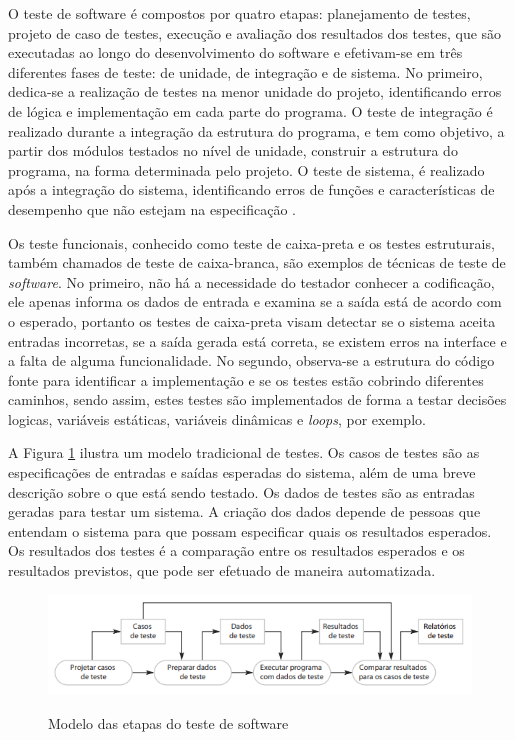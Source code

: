 O teste de software é compostos por quatro etapas: planejamento de testes, projeto de caso de testes, execução e avaliação dos resultados dos testes, que são executadas ao longo do desenvolvimento do software e efetivam-se em três diferentes fases de teste: de unidade, de integração e de sistema. No primeiro, dedica-se a realização de testes na menor unidade do projeto, identificando erros de lógica e implementação em cada parte do programa. O teste de integração é realizado durante a integração da estrutura do programa, e tem como objetivo, a partir dos módulos testados no nível de unidade, construir a estrutura do programa, na forma determinada pelo projeto. O teste de sistema, é realizado após a integração do sistema, identificando erros de funções e características de desempenho que não estejam na especificação \cite{Maldonado2004}.

Os teste funcionais, conhecido como teste de caixa-preta e os testes estruturais, também chamados de teste de caixa-branca, são exemplos de técnicas de teste de \textit{software}. No primeiro, não há a necessidade do testador conhecer a codificação, ele apenas informa os dados de entrada e examina se a saída está de acordo com o esperado, portanto os testes de caixa-preta visam detectar se o sistema aceita entradas incorretas, se a saída gerada está correta, se existem erros na interface e a falta de alguma funcionalidade. No segundo, observa-se a estrutura do código fonte para identificar a implementação e se os testes estão cobrindo diferentes caminhos, sendo assim, estes testes são implementados de forma a testar decisões logicas, variáveis estáticas, variáveis dinâmicas e \textit{loops}, por exemplo.\cite{Pedro}

A Figura \ref{fig:figura-modelo-etapas-teste-de-software} ilustra um modelo tradicional de testes. Os casos de testes são as especificações de entradas e saídas esperadas do sistema, além de uma breve descrição sobre o que está sendo testado. Os dados de testes são as entradas geradas para testar um sistema. A criação dos dados depende de pessoas que entendam o sistema para que possam especificar quais os resultados esperados. Os resultados dos testes é a comparação entre os resultados esperados e os resultados previstos, que pode ser efetuado de maneira automatizada.

\begin{figure}[!htb]
    \centering
    \caption{Modelo das etapas do teste de software}
    \includegraphics[width=1\textwidth]{./dados/figuras/Modelo_processo_de_software}
    \label{fig:figura-modelo-etapas-teste-de-software}
\end{figure}



